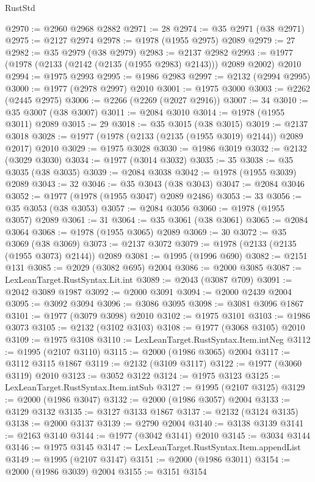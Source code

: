 \begin{lexlean}{RustStd}
\begin{coremodule}
@2970 := @2960 @2968 @2882
@2971 := 28
@2974 := @35 @2971 (@38 @2971)
@2975 := @2127 @2974
@2978 := @1978 (@1955 @2975) @2089
@2979 := 27
@2982 := @35 @2979 (@38 @2979)
@2983 := @2137 @2982
@2993 := @1977 (@1978 (@2133 (@2142 (@2135 (@1955 @2983) @2143))) @2089 @2002) @2010
@2994 := @1975 @2993
@2995 := @1986 @2983
@2997 := @2132 (@2994 @2995)
@3000 := @1977 (@2978 @2997) @2010
@3001 := @1975 @3000
@3003 := @2262 (@2445 @2975)
@3006 := @2266 (@2269 (@2027 @2916))
@3007 := 34
@3010 := @35 @3007 (@38 @3007)
@3011 := @2084 @3010
@3014 := @1978 (@1955 @3011) @2089
@3015 := 29
@3018 := @35 @3015 (@38 @3015)
@3019 := @2137 @3018
@3028 := @1977 (@1978 (@2133 (@2135 (@1955 @3019) @2144)) @2089 @2017) @2010
@3029 := @1975 @3028
@3030 := @1986 @3019
@3032 := @2132 (@3029 @3030)
@3034 := @1977 (@3014 @3032)
@3035 := 35
@3038 := @35 @3035 (@38 @3035)
@3039 := @2084 @3038
@3042 := @1978 (@1955 @3039) @2089
@3043 := 32
@3046 := @35 @3043 (@38 @3043)
@3047 := @2084 @3046
@3052 := @1977 (@1978 (@1955 @3047) @2089 @2486)
@3053 := 33
@3056 := @35 @3053 (@38 @3053)
@3057 := @2084 @3056
@3060 := @1978 (@1955 @3057) @2089
@3061 := 31
@3064 := @35 @3061 (@38 @3061)
@3065 := @2084 @3064
@3068 := @1978 (@1955 @3065) @2089
@3069 := 30
@3072 := @35 @3069 (@38 @3069)
@3073 := @2137 @3072
@3079 := @1978 (@2133 (@2135 (@1955 @3073) @2144)) @2089
@3081 := @1995 (@1996 @690)
@3082 := @2151 @131
@3085 := @2029 (@3082 @695) @2004
@3086 := @2000 @3085
@3087 := LexLeanTarget.RustSyntax.Lit.int
@3089 := @2043 (@3087 @709)
@3091 := @2042 @3089 @1987
@3092 := @2000 @3091
@3094 := @2000 @2439 @2004
@3095 := @3092 @3094
@3096 := @3086 @3095
@3098 := @3081 @3096 @1867
@3101 := @1977 (@3079 @3098) @2010
@3102 := @1975 @3101
@3103 := @1986 @3073
@3105 := @2132 (@3102 @3103)
@3108 := @1977 (@3068 @3105) @2010
@3109 := @1975 @3108
@3110 := LexLeanTarget.RustSyntax.Item.intNeg
@3112 := @1995 (@2107 @3110)
@3115 := @2000 (@1986 @3065) @2004
@3117 := @3112 @3115 @1867
@3119 := @2132 (@3109 @3117)
@3122 := @1977 (@3060 @3119) @2010
@3123 := @3052 @3122
@3124 := @1975 @3123
@3125 := LexLeanTarget.RustSyntax.Item.intSub
@3127 := @1995 (@2107 @3125)
@3129 := @2000 (@1986 @3047)
@3132 := @2000 (@1986 @3057) @2004
@3133 := @3129 @3132
@3135 := @3127 @3133 @1867
@3137 := @2132 (@3124 @3135)
@3138 := @2000 @3137
@3139 := @2790 @2004
@3140 := @3138 @3139
@3141 := @2163 @3140
@3144 := @1977 (@3042 @3141) @2010
@3145 := @3034 @3144
@3146 := @1975 @3145
@3147 := LexLeanTarget.RustSyntax.Item.appendList
@3149 := @1995 (@2107 @3147)
@3151 := @2000 (@1986 @3011)
@3154 := @2000 (@1986 @3039) @2004
@3155 := @3151 @3154

\end{coremodule}
\end{lexlean}
